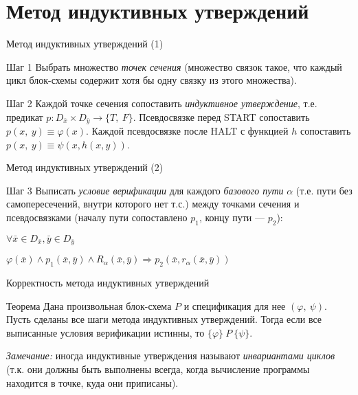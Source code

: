 \documentclass[hyperref={unicode=true}]{beamer}
\begin{document}
	\section{Метод индуктивных утверждений}

	\begin{frame}{Метод индуктивных утверждений (1)}
	\begin{block}{Шаг 1}
	Выбрать множество \emph{точек сечения} (множество связок такое, что каждый цикл блок-схемы содержит хотя бы одну связку из этого множества).
	\end{block}
	\begin{block}{Шаг 2}
	Каждой точке сечения сопоставить \emph{индуктивное утверждение}, т.е. предикат $p : D_{\bar{x}} \times D_{\bar{y}} \rightarrow \{T,~F\}$. Псевдосвязке перед START сопоставить $p(x,~y)\equiv\varphi(x)$. Каждой псевдосвязке после HALT с функцией $h$ сопоставить $p(x,~y)\equiv\psi(x,h(x,y))$.
	\end{block}
    \end{frame}
    \begin{frame}{Метод индуктивных утверждений (2)}
	\begin{block}{Шаг 3}
	Выписать \emph{условие верификации} для каждого \emph{базового пути} $\alpha$ (т.е. пути без самопересечений, внутри которого нет т.с.) между точками сечения и псевдосвязками (началу пути сопоставлено $p_1$, концу пути --- $p_2$):

    $\forall \bar{x} \in D_{\bar{x}},\bar{y} \in D_{\bar{y}}$

    $\varphi(\bar{x})\land p_1(\bar{x},\bar{y})\land R_{\alpha}(\bar{x},\bar{y}) \Rightarrow p_2(\bar{x},r_{\alpha}(\bar{x},\bar{y}))$
    \end{block}
	\end{frame}

	\begin{frame}{Корректность метода индуктивных утверждений}
	\begin{block}{Теорема}
		Дана произвольная блок-схема $P$ и спецификация для нее $(\varphi,~\psi)$. Пусть сделаны все шаги метода индуктивных утверждений. Тогда если все выписанные условия верификации истинны, то $\{\varphi\}~P~\{\psi\}$.
	\end{block}

	\emph{Замечание:} иногда индуктивные утверждения называют \emph{инвариантами циклов} (т.к. они должны быть выполнены всегда, когда вычисление программы находится в точке, куда они приписаны).
	\end{frame}
\end{document}
